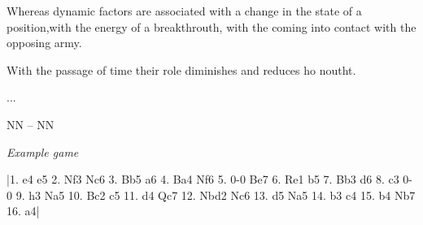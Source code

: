 \documentclass[10pt]{article}
\begin{document}
Whereas dynamic factors are associated with a change in the state of a
position,with the energy of a breakthrouth, with the coming into contact
with the opposing army.

With the passage of time their role diminishes and reduces ho noutht.

...
\newgame
\twocolumn
\renewcommand\afterno{~}
\renewcommand\iiopent{\par}
\renewcommand\iicloset{\par}
\renewcommand\takes{x}
\renewcommand\beforeb{\the\move.~\dots\ }

\begin{center}
\textsf{NN -- NN}

\textit{Example game}
\end{center}
\noindent|1. e4 e5 2. Nf3 Nc6 3. Bb5 a6 4. Ba4 Nf6 5. 0-0 Be7 6. Re1 b5 7. Bb3 d6 8. c3 0-0 9. h3 Na5 10. Bc2 c5 11. d4 Qc7 12. Nbd2 Nc6 13. d5 Na5 14. b3 c4 15. b4 Nb7 16. a4|

\begin{center}
\showboard
\end{center}
\end{document}
